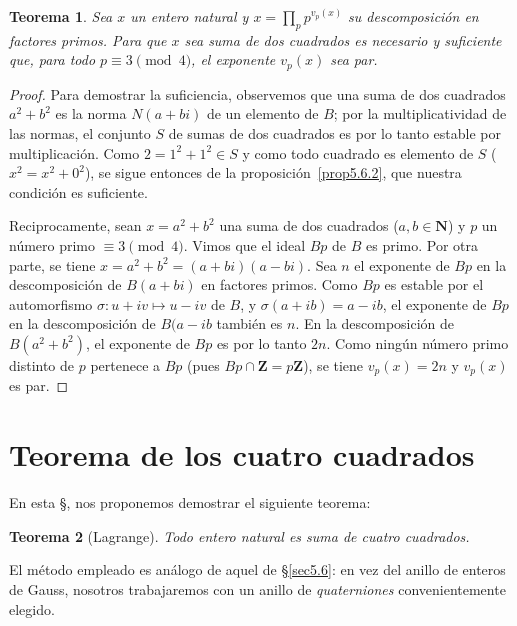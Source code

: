 \documentclass[oneside,bibtotoc,leqno,spanish]{amsbook}
\newcommand{\ZZ}{\mathbf{Z}}
\newcommand{\NN}{\mathbf{N}}
\newcommand{\QED}{}%
\numberwithin{equation}{section}
\theoremstyle{defi}
\theoremstyle{note}
\newtheorem{theorem}{Teorema}
\theoremstyle{rem}
\numberwithin{theorem}{section}
\numberwithin{proposition}{section}
\numberwithin{definition}{section}
\numberwithin{lemma}{section}
\numberwithin{corollary}{section}
\numberwithin{example}{section}
\numberwithin{footnote}{section}%
\begin{document}
\begin{theorem}
Sea $x$ un entero natural y $x = \prod_{p}p^{v_{p}(x)}$ su descomposici\'on en factores primos. Para que $x$
sea suma de dos cuadrados es necesario y suficiente que, para todo $p\equiv 3\pmod 4$, el exponente
$v_{p}(x)$ sea par.
\end{theorem}

\begin{proof}
Para demostrar la suficiencia, observemos que una suma de dos cuadrados $a^{2}+b^{2}$ es la norma
$N(a+bi)$ de un elemento de $B$; por la multiplicatividad de las normas, el conjunto $S$ de sumas de dos
cuadrados es por lo tanto estable por multiplicaci\'on. Como $2 = 1^{2}+1^{2}\in S$ y como todo cuadrado
es elemento de $S$ ($x^{2}=x^{2}+0^{2}$), se sigue entonces de la
proposici\'on~\ref{prop5.6.2}, que nuestra condici\'on es suficiente.

Reciprocamente, sean $x=a^{2}+b^{2}$ una suma de dos cuadrados ($a,b\in\NN$) y $p$ un n\'umero primo
$\equiv 3\pmod 4$. Vimos que el ideal $Bp$ de $B$ es primo. Por otra parte, se tiene
$x = a^{2}+b^{2}=(a+bi)(a-bi)$. Sea $n$ el exponente de $Bp$ en la descomposici\'on de $B(a+bi)$ en factores
primos. Como $Bp$ es estable por el automorfismo $\sigma:u+iv\mapsto u-iv$ de $B$, y $\sigma(a+ib)=a-ib$,
el exponente de $Bp$ en la descomposici\'on de $B(a-ib$ tambi\'en es $n$. En la descomposici\'on de
$B(a^{2}+b^{2})$, el exponente de $Bp$ es por lo tanto $2n$. Como ning\'un n\'umero primo distinto de
$p$ pertenece a $Bp$ (pues $Bp\cap\ZZ = p\ZZ$), se tiene $v_{p}(x) = 2n$ y $v_{p}(x)$ es par. \QED
\end{proof}

\section{Teorema de los cuatro cuadrados}\label{sec5.7}

En esta \S, nos proponemos demostrar el siguiente teorema:

\begin{theorem}[Lagrange]\label{teo5.7.1}
Todo entero natural es suma de cuatro cuadrados.
\end{theorem}

El m\'etodo empleado es an\'alogo de aquel de \S\ref{sec5.6}: en vez del anillo de enteros de Gauss, nosotros
trabajaremos con un anillo de {\em quaterniones} convenientemente elegido.
\end{document}
